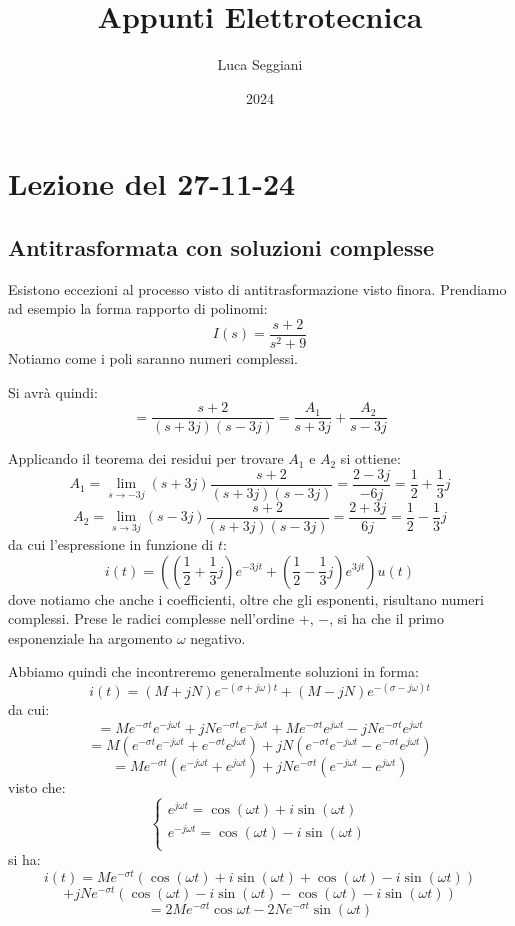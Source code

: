 \documentclass[a4paper,11pt]{article}
\title{Appunti Elettrotecnica}
\author{Luca Seggiani}
\date{2024}
\begin{document}
\section{Lezione del 27-11-24}

\thispagestyle{empty}
\pagestyle{fancy}

\subsection{Antitrasformata con soluzioni complesse}
Esistono eccezioni al processo visto di antitrasformazione visto finora.
Prendiamo ad esempio la forma rapporto di polinomi:
$$
I(s) = \frac{s + 2}{s^2 + 9}
$$
Notiamo come i poli saranno numeri complessi.

Si avrà quindi:
$$
= \frac{s + 2}{(s+3j)(s-3j)} = \frac{A_1}{s+3j} + \frac{A_2}{s-3j}
$$

Applicando il teorema dei residui per trovare $A_1$ e $A_2$ si ottiene:
$$
A_1 = \lim_{s\rightarrow -3j} (s + 3j) \frac{s + 2}{(s+3j)(s-3j)} = \frac{2-3j}{-6j} = \frac{1}{2} + \frac{1}{3}j
$$
$$
A_2 = \lim_{s\rightarrow 3j} (s - 3j) \frac{s + 2}{(s+3j)(s-3j)} = \frac{2+3j}{6j} = \frac{1}{2} - \frac{1}{3}j
$$
da cui l'espressione in funzione di $t$:
$$
i(t) = \left( \left( \frac{1}{2} + \frac{1}{3}j \right) e^{-3j t} + \left( \frac{1}{2} - \frac{1}{3}j \right) e^{3jt} \right) u(t)
$$
dove notiamo che anche i coefficienti, oltre che gli esponenti, risultano numeri complessi.
Prese le radici complesse nell'ordine $+$, $-$, si ha che il primo esponenziale ha argomento $\omega$ negativo.

Abbiamo quindi che incontreremo generalmente soluzioni in forma:
$$
i(t) = \left( M + jN \right) e^{-(\sigma + j \omega)t} + \left( M - jN \right) e^{-(\sigma - j \omega)t}
$$
da cui:
$$
= M e^{-\sigma t}e^{-j \omega t} + j N e^{-\sigma t}e^{-j \omega t} + M e^{-\sigma t}e^{j \omega t} - jN e^{-\sigma t}e^{j \omega t}
$$
$$
= M \left( e^{- \sigma t}e^{-j \omega t} + e^{- \sigma t}e^{j \omega t} \right) + j N  \left( e^{-\sigma t}e^{-j \omega t} - e^{-\sigma t}e^{j \omega t} \right)
$$
$$
= M e^{- \sigma t} \left( e^{-j \omega t} + e^{j \omega t} \right) + j N e^{-\sigma t} \left( e^{-j \omega t} - e^{j \omega t} \right)
$$
visto che:
\[
	\begin{cases}
		e^{j \omega t} = \cos(\omega t) + i \sin(\omega t) \\ 	
		e^{-j \omega t} = \cos(\omega t) - i \sin(\omega t) \\ 	
	\end{cases}
\]
si ha:
$$
i(t) = M e^{-\sigma t} ( \cos(\omega t) + i \sin(\omega t) + \cos(\omega t) - i \sin(\omega t) ) 
$$
$$
+ j N e^{-\sigma t} ( \cos(\omega t) - i \sin(\omega t) - \cos(\omega t) - i \sin(\omega t) )
$$
$$
= 2 M e^{-\sigma t} \cos{\omega t} - 2 N e^{-\sigma t} \sin(\omega t)
$$
\end{document}
